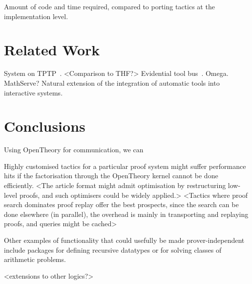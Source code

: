 \documentclass{llncs}
\newcommand{\OpenTheory}{OpenTheory\xspace}
\begin{document}
Amount of code and time required, compared to porting tactics at the implementation level.

\section{Related Work}

System on TPTP~\cite{DBLP:conf/lpar/Sutcliffe10}.
<Comparison to THF?>
Evidential tool bus~\cite{DBLP:conf/icfem/Rushby05,fk:etb}.
Omega.
MathServe?
Natural extension of the integration of automatic tools into interactive systems.

\section{Conclusions}

Using \OpenTheory for communication, we can 

Highly customised tactics for a particular proof system might suffer performance hits if the factorisation through the OpenTheory kernel cannot be done efficiently.
<The article format might admit optimisation by restructuring low-level proofs, and such optimisers could be widely applied.>
<Tactics where proof search dominates proof replay offer the best prospects, since the search can be done elsewhere (in parallel), the overhead is mainly in transporting and replaying proofs, and queries might be cached>

Other examples of functionality that could usefully be made prover-independent include packages for defining recursive datatypes or for solving classes of arithmetic problems.

<extensions to other logics?>



\end{document}
